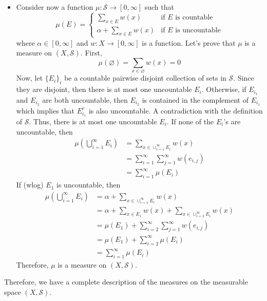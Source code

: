 \begin{solution}
\begin{itemize}
        \item Consider now a function $\mu : \mathcal{S} \to [0, \infty]$ such that 
        $$\mu(E) = \begin{cases}
            \sum_{x \in E}w(x) & \text{if } E \text{ is countable} \\
            \alpha + \sum_{x \in E}w(x) & \text{if } E \text{ is uncountable}
        \end{cases}$$
        where $\alpha \in [0, \infty]$ and $w: X \to [0, \infty]$ is a function. Let's prove that $\mu$ is a measure on $(X, \mathcal{S})$. First,
        $$\mu(\varnothing) = \sum_{x \in \varnothing}w(x) = 0$$
        Now, let $\{E_i\}_i$ be a countable pairwise disjoint collection of sets in $\mathcal{S}$. Since they are disjoint, then there is at most one uncountable $E_i$. Otherwise, if $E_{i_1}$ and $E_{i_2}$ are both uncountable, then $E_{i_2}$ is contained in the complement of $E_{i_1}$ which implies that $E_{i_1}^c$ is also uncountable. A contradiction with the definition of $\mathcal{S}$. Thus, there is at most one uncountable $E_i$. If none of the $E_i$'s are uncountable, then
        \begin{align*}
            \mu\left(\bigcup_{i=1}^{\infty}E_i\right) &= \sum_{x \in \cup_{i=1}^{\infty}E_i}w(x) \\
            &= \sum_{i=1}^{\infty}\sum_{j=1}^{\infty}w(e_{i,j}) \\
            &= \sum_{i=1}^{\infty}\mu(E_i)
        \end{align*}
        If (wlog) $E_1$ is uncountable, then
        \begin{align*}
            \mu\left(\bigcup_{i=1}^{\infty}E_i\right) &= \alpha + \sum_{x \in \cup_{i=1}^{\infty}E_i}w(x) \\
            &= \alpha + \sum_{x \in E_1}w(x) + \sum_{x \in \cup_{i=2}^{\infty}E_i}w(x) \\
            &= \mu(E_1) + \sum_{i=2}^{\infty}\sum_{j=1}^{\infty}w(e_{i,j}) \\
            &= \mu(E_1) + \sum_{i=2}^{\infty}\mu(E_i) \\
            &= \sum_{i=1}^{\infty}\mu(E_i) 
        \end{align*}
        Therefore, $\mu$ is a measure on $(X, \mathcal{S})$.
    \end{itemize}
    Therefore, we have a complete description of the measures on the measurable space $(X, \mathcal{S})$.
\end{solution}